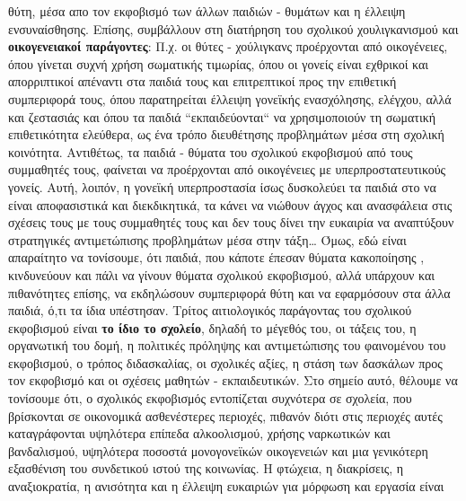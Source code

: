 \documentclass[12pt,a4paper]{book}
\begin{document}
θύτη, μέσα απο τον εκφοβισμό των άλλων παιδιών - θυμάτων και η έλλειψη
ενσυναίσθησης.
\newline\setlength{\parindent}{20pt}\indent  Επίσης, συμβάλλουν στη διατήρηση
του σχολικού χουλιγκανισμού και \textbf{οικογενειακοί παράγοντες}: Π.χ. οι θύτες
- χούλιγκανς προέρχονται από οικογένειες, όπου γίνεται συχνή χρήση σωματικής
τιμωρίας, όπου οι γονείς είναι εχθρικοί και απορριπτικοί απέναντι στα παιδιά
τους και επιτρεπτικοί προς την επιθετική συμπεριφορά τους, όπου παρατηρείται
έλλειψη γονεϊκής ενασχόλησης, ελέγχου, αλλά και ζεστασιάς και όπου τα παιδιά
``εκπαιδεύονται`` να χρησιμοποιούν τη σωματική επιθετικότητα ελεύθερα, ως ένα
τρόπο  διευθέτησης προβλημάτων μέσα στη σχολική κοινότητα.
\newline\setlength{\parindent}{20pt}\indent Αντιθέτως, τα παιδιά - θύματα του
σχολικού εκφοβισμού από τους συμμαθητές τους, φαίνεται να προέρχονται από
οικογένειες με υπερπροστατευτικούς γονείς. Αυτή, λοιπόν, η γονεϊκή υπερπροστασία
ίσως δυσκολεύει τα παιδιά στο να είναι αποφασιστικά και διεκδικητικά, τα κάνει
να νιώθουν άγχος και ανασφάλεια στις σχέσεις τους με τους συμμαθητές τους και
δεν τους δίνει την ευκαιρία να αναπτύξουν στρατηγικές αντιμετώπισης προβλημάτων
μέσα στην τάξη\ldots
\newline\setlength{\parindent}{20pt}\indent Όμως, εδώ είναι απαραίτητο να
τονίσουμε, ότι παιδιά, που κάποτε έπεσαν θύματα κακοποίησης , κινδυνεύουν και
πάλι να γίνουν θύματα σχολικού εκφοβισμού, αλλά υπάρχουν και πιθανότητες επίσης,
να εκδηλώσουν συμπεριφορά θύτη και να εφαρμόσουν στα άλλα παιδιά, ό,τι τα ίδια
υπέστησαν.
\newline\setlength{\parindent}{20pt}\indent Τρίτος αιτιολογικός παράγοντας του
σχολικού εκφοβισμού είναι \textbf{το ίδιο το σχολείο}, δηλαδή το μέγεθός του, οι
τάξεις του, η οργανωτική του δομή, η πολιτικές πρόληψης και αντιμετώπισης του
φαινομένου του εκφοβισμού, ο τρόπος διδασκαλίας, οι σχολικές αξίες, η στάση των
δασκάλων προς τον εκφοβισμό και οι σχέσεις μαθητών - εκπαιδευτικών.
\newline\setlength{\parindent}{20pt}\indent Στο σημείο αυτό, θέλουμε να
τονίσουμε ότι, ο σχολικός εκφοβισμός εντοπίζεται συχνότερα σε σχολεία, που
βρίσκονται σε οικονομικά ασθενέστερες περιοχές, πιθανόν διότι στις περιοχές
αυτές καταγράφονται υψηλότερα επίπεδα αλκοολισμού, χρήσης ναρκωτικών και
βανδαλισμού, υψηλότερα ποσοστά μονογονεϊκών οικογενειών και μια  γενικότερη
εξασθένιση του συνδετικού ιστού της κοινωνίας. Η φτώχεια, η διακρίσεις, η
αναξιοκρατία, η ανισότητα και η έλλειψη ευκαιριών για μόρφωση και εργασία είναι
\end{document}
